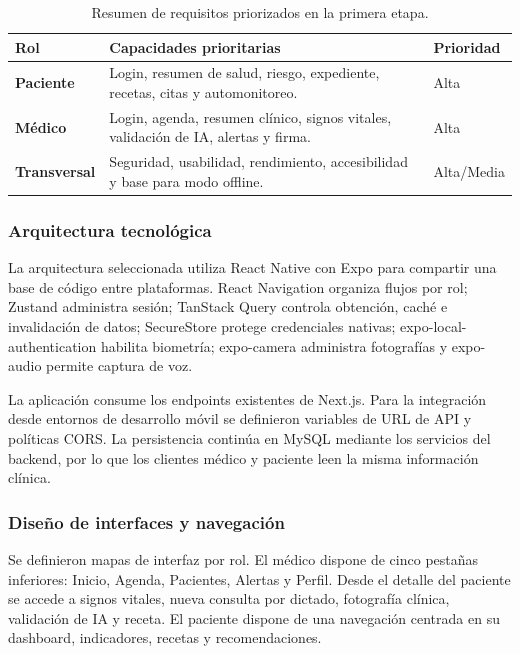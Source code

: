 \documentclass[12pt,letterpaper]{report}
\begin{document}
\begin{table}[htbp]
\centering
\caption{Resumen de requisitos priorizados en la primera etapa.}
\begin{tabularx}{\linewidth}{>{\bfseries}p{2.4cm}X>{\centering\arraybackslash}p{2.1cm}}
\toprule
Rol & Capacidades prioritarias & Prioridad \\
\midrule
Paciente & Login, resumen de salud, riesgo, expediente, recetas, citas y automonitoreo. & Alta \\
Médico & Login, agenda, resumen clínico, signos vitales, validación de IA, alertas y firma. & Alta \\
Transversal & Seguridad, usabilidad, rendimiento, accesibilidad y base para modo offline. & Alta/Media \\
\bottomrule
\end{tabularx}
\end{table}

\subsubsection{Arquitectura tecnológica}

La arquitectura seleccionada utiliza React Native con Expo para compartir una base de código entre plataformas. React Navigation organiza flujos por rol; Zustand administra sesión; TanStack Query controla obtención, caché e invalidación de datos; SecureStore protege credenciales nativas; expo-local-authentication habilita biometría; expo-camera administra fotografías y expo-audio permite captura de voz.

La aplicación consume los endpoints existentes de Next.js. Para la integración desde entornos de desarrollo móvil se definieron variables de URL de API y políticas CORS. La persistencia continúa en MySQL mediante los servicios del backend, por lo que los clientes médico y paciente leen la misma información clínica.

\subsubsection{Diseño de interfaces y navegación}

Se definieron mapas de interfaz por rol. El médico dispone de cinco pestañas inferiores: Inicio, Agenda, Pacientes, Alertas y Perfil. Desde el detalle del paciente se accede a signos vitales, nueva consulta por dictado, fotografía clínica, validación de IA y receta. El paciente dispone de una navegación centrada en su dashboard, indicadores, recetas y recomendaciones.
\end{document}

